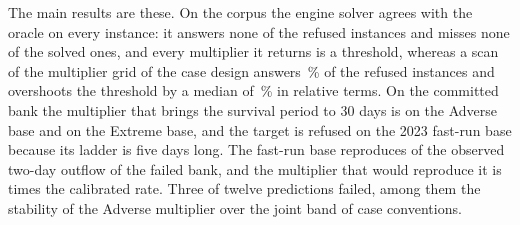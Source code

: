 The main results are these. On the corpus the engine solver agrees with the oracle on every instance: it answers none of the \kRefused{} refused instances and misses none of the \kSolved{} solved ones, and every multiplier it returns is a threshold, whereas a scan of the multiplier grid of the case design answers \kGFalse{}\,\% of the refused instances and overshoots the threshold by a median of \kGErrPc{}\,\% in relative terms. On the committed bank the multiplier that brings the survival period to 30 days is \mAdv{} on the Adverse base and \mExt{} on the Extreme base, and the target is refused on the 2023 fast-run base because its ladder is five days long. The fast-run base reproduces \svbRatio{} of the observed two-day outflow of the failed bank, and the multiplier that would reproduce it is \mSvb{} times the calibrated rate. Three of twelve predictions failed, among them the stability of the Adverse multiplier over the joint band of case conventions.
